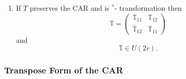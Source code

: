 \documentclass[aps, preprint]{revtex4}
\begin{document}
\begin{enumerate}
\item If $T$ preserves the CAR and is $^{ \ast }$- transformation then
\begin{equation}\mathbb{T} =\left (\begin{array}{cc}\mathbb{T}_{1 1} & \mathbb{T}_{1 2} \\
\overline{\mathbb{T}}_{1 2} & \overline{\mathbb{T}}_{1 1}\end{array}\right )
\end{equation}and
\begin{equation}\mathbb{T} \in U \left (2 r\right )\text{.}
\end{equation}\end{enumerate}


\subsubsection{Transpose Form of the CAR}
\end{document}
